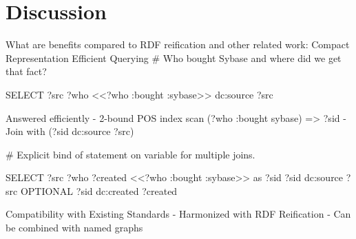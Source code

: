 \section{Discussion}
What are benefits compared to RDF reification and other related work:
Compact Representation 
Efficient Querying 
 # Who bought Sybase and where did we get that fact?

SELECT ?src ?who {
   <<?who :bought :sybase>> dc:source ?src
}

Answered efficiently
-	2-bound POS index scan (?who :bought sybase) => ?sid
-	Join with (?sid dc:source ?src)

# Explicit bind of statement on variable for multiple joins.

SELECT ?src ?who ?created {
   <<?who :bought :sybase>> as ?sid
   ?sid dc:source ?src
   OPTIONAL {?sid dc:created ?created}
}

Compatibility with Existing Standards
-	Harmonized with RDF Reification
-	Can be combined with named graphs

